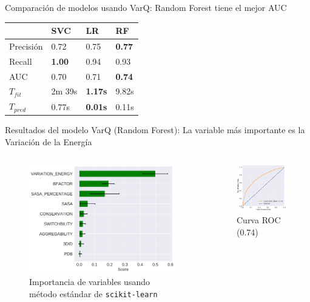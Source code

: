 \documentclass[
  spanish,
  ignorenonframetext,
]{beamer}
\begin{document}
\begin{frame}{Comparación de modelos usando VarQ: Random Forest tiene el
mejor AUC}
\protect\hypertarget{comparaciuxf3n-de-modelos-usando-varq-random-forest-tiene-el-mejor-auc}{}

\begin{longtable}[]{@{}llll@{}}
\toprule
& SVC & LR & RF\tabularnewline
\midrule
\endhead
Precisión & 0.72 & 0.75 & \textbf{0.77}\tabularnewline
Recall & \textbf{1.00} & 0.94 & 0.93\tabularnewline
AUC & 0.70 & 0.71 & \textbf{0.74}\tabularnewline
\(T_{fit}\) & 2m 39s & \textbf{1.17s} & 9.82s\tabularnewline
\(T_{pred}\) & 0.77s & \textbf{0.01s} & 0.11s\tabularnewline
\bottomrule
\end{longtable}

\end{frame}

\begin{frame}{Resultados del modelo VarQ (Random Forest): La variable
más importante es la Variación de la Energía}
\protect\hypertarget{resultados-del-modelo-varq-random-forest-la-variable-muxe1s-importante-es-la-variaciuxf3n-de-la-energuxeda}{}

\begin{columns}[T]
\begin{column}{0.48\textwidth}
\begin{figure}
\centering
\includegraphics[width=2.60417in,height=\textheight]{importances_varq.pdf}
\caption{Importancia de variables usando método estándar de
\texttt{scikit-learn}}
\end{figure}
\end{column}

\begin{column}{0.48\textwidth}
\begin{figure}
\centering
\includegraphics[width=1.77083in,height=\textheight]{auc_varq.pdf}
\caption{Curva ROC (0.74)}
\end{figure}
\end{column}
\end{columns}

\end{frame}
\end{document}
